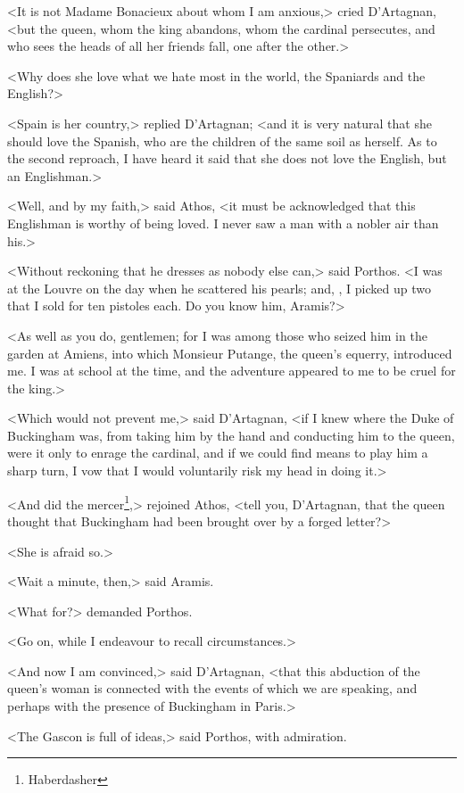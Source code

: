 <It is not Madame Bonacieux about whom I am anxious,> cried D'Artagnan, <but the queen, whom the king abandons, whom the cardinal persecutes, and who sees the heads of all her friends fall, one after the other.> 

<Why does she love what we hate most in the world, the Spaniards and the English?> 

<Spain is her country,> replied D'Artagnan; <and it is very natural that she should love the Spanish, who are the children of the same soil as herself. As to the second reproach, I have heard it said that she does not love the English, but an Englishman.> 

<Well, and by my faith,> said Athos, <it must be acknowledged that this Englishman is worthy of being loved. I never saw a man with a nobler air than his.> 

<Without reckoning that he dresses as nobody else can,> said Porthos. <I was at the Louvre on the day when he scattered his pearls; and, , I picked up two that I sold for ten pistoles each. Do you know him, Aramis?> 

<As well as you do, gentlemen; for I was among those who seized him in the garden at Amiens, into which Monsieur Putange, the queen's equerry, introduced me. I was at school at the time, and the adventure appeared to me to be cruel for the king.> 

<Which would not prevent me,> said D'Artagnan, <if I knew where the Duke of Buckingham was, from taking him by the hand and conducting him to the queen, were it only to enrage the cardinal, and if we could find means to play him a sharp turn, I vow that I would voluntarily risk my head in doing it.> 

<And did the mercer\footnote{Haberdasher},> rejoined Athos, <tell you, D'Artagnan, that the queen thought that Buckingham had been brought over by a forged letter?> 

<She is afraid so.> 

<Wait a minute, then,> said Aramis. 

<What for?> demanded Porthos. 

<Go on, while I endeavour to recall circumstances.> 

<And now I am convinced,> said D'Artagnan, <that this abduction of the queen's woman is connected with the events of which we are speaking, and perhaps with the presence of Buckingham in Paris.> 

<The Gascon is full of ideas,> said Porthos, with admiration. 

